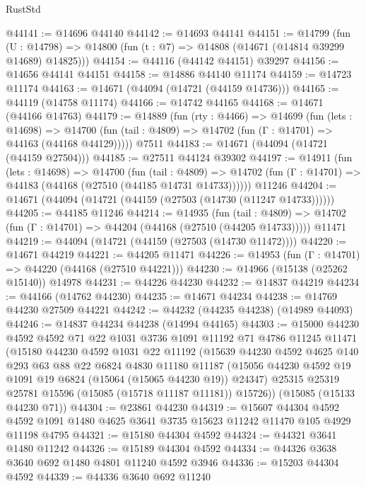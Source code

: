 \begin{lexlean}{RustStd}
\begin{coremodule}
@44141 := @14696 @44140
@44142 := @14693 @44141
@44151 := @14799
    (fun (U : @14798) => @14800 (fun (t : @7) => @14808 (@14671 (@14814 @39299 @14689) @14825)))
@44154 := @44116 (@44142 @44151) @39297
@44156 := @14656 @44141 @44151
@44158 := @14886 @44140 @11174
@44159 := @14723 @11174
@44163 := @14671 (@44094 (@14721 (@44159 @14736)))
@44165 := @44119 (@14758 @11174)
@44166 := @14742 @44165
@44168 := @14671 (@44166 @14763)
@44179 := @14889
    (fun (rty : @4466) =>
    @14699
      (fun (lets : @14698) =>
      @14700 (fun (tail : @4809) => @14702 (fun (Γ : @14701) => @44163 (@44168 @44129)))))
    @7511
@44183 := @14671 (@44094 (@14721 (@44159 @27504)))
@44185 := @27511 @44124 @39302
@44197 := @14911
    (fun (lets : @14698) =>
    @14700
      (fun (tail : @4809) =>
      @14702 (fun (Γ : @14701) => @44183 (@44168 (@27510 (@44185 @14731 @14733))))))
    @11246
@44204 := @14671 (@44094 (@14721 (@44159 (@27503 (@14730 (@11247 @14733))))))
@44205 := @44185 @11246
@44214 := @14935
    (fun (tail : @4809) => @14702 (fun (Γ : @14701) => @44204 (@44168 (@27510 (@44205 @14733)))))
    @11471
@44219 := @44094 (@14721 (@44159 (@27503 (@14730 @11472))))
@44220 := @14671 @44219
@44221 := @44205 @11471
@44226 := @14953 (fun (Γ : @14701) => @44220 (@44168 (@27510 @44221)))
@44230 := @14966 (@15138 (@25262 @15140)) @14978
@44231 := @44226 @44230
@44232 := @14837 @44219
@44234 := @44166 (@14762 @44230)
@44235 := @14671 @44234
@44238 := @14769 @44230 @27509 @44221
@44242 := @44232 (@44235 @44238) (@14989 @44093)
@44246 := @14837 @44234 @44238 (@14994 @44165)
@44303 := @15000
    @44230
    @4592
    @4592
    @71
    @22
    @1031
    @3736
    @1091
    @11192
    @71
    @4786
    @11245
    @11471
    (@15180
      @44230
      @4592
      @1031
      @22
      @11192
      (@15639
        @44230
        @4592
        @4625
        @140
        @293
        @63
        @88
        @22
        @6824
        @4830
        @11180
        @11187
        (@15056 @44230 @4592 @19 @1091 @19 @6824 (@15064 (@15065 @44230 @19)) @24347)
        @25315
        @25319
        @25781
        @15596
        (@15085 (@15718 @11187 @11181))
        @15726))
    (@15085 (@15133 @44230 @71))
@44304 := @23861 @44230
@44319 := @15607
    @44304
    @4592
    @4592
    @1091
    @1480
    @4625
    @3641
    @3735
    @15623
    @11242
    @11470
    @105
    @4929
    @11198
    @4795
@44321 := @15180 @44304 @4592
@44324 := @44321 @3641 @1480 @11242
@44326 := @15189 @44304 @4592
@44334 := @44326 @3638 @3640 @692 @1480 @4801 @11240 @4592 @3946
@44336 := @15203 @44304 @4592
@44339 := @44336 @3640 @692 @11240

\end{coremodule}
\end{lexlean}
